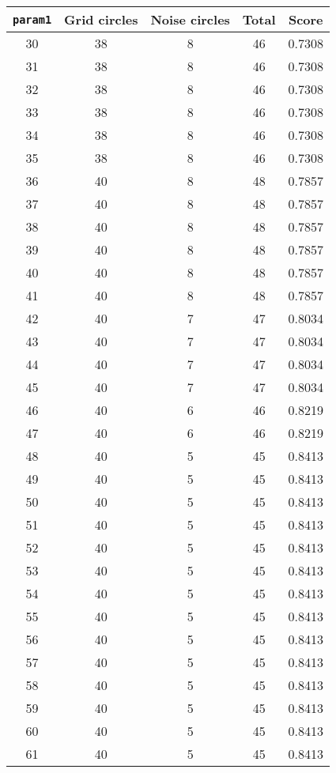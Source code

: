 \documentclass[letterpaper, 12pt]{article}
\begin{document}
\begin{longtable}{|c|c|c|c|c|}
\hline
\textbf{\texttt{param1}} & \textbf{Grid circles} & \textbf{Noise circles} & \textbf{Total} & \textbf{Score} \\
\hline
30 & 38 & 8 & 46 & 0.7308 \\
\hline
31 & 38 & 8 & 46 & 0.7308 \\
\hline
32 & 38 & 8 & 46 & 0.7308 \\
\hline
33 & 38 & 8 & 46 & 0.7308 \\
\hline
34 & 38 & 8 & 46 & 0.7308 \\
\hline
35 & 38 & 8 & 46 & 0.7308 \\
\hline
36 & 40 & 8 & 48 & 0.7857 \\
\hline
37 & 40 & 8 & 48 & 0.7857 \\
\hline
38 & 40 & 8 & 48 & 0.7857 \\
\hline
39 & 40 & 8 & 48 & 0.7857 \\
\hline
40 & 40 & 8 & 48 & 0.7857 \\
\hline
41 & 40 & 8 & 48 & 0.7857 \\
\hline
42 & 40 & 7 & 47 & 0.8034 \\
\hline
43 & 40 & 7 & 47 & 0.8034 \\
\hline
44 & 40 & 7 & 47 & 0.8034 \\
\hline
45 & 40 & 7 & 47 & 0.8034 \\
\hline
46 & 40 & 6 & 46 & 0.8219 \\
\hline
47 & 40 & 6 & 46 & 0.8219 \\
\hline
48 & 40 & 5 & 45 & 0.8413 \\
\hline
49 & 40 & 5 & 45 & 0.8413 \\
\hline
50 & 40 & 5 & 45 & 0.8413 \\
\hline
51 & 40 & 5 & 45 & 0.8413 \\
\hline
52 & 40 & 5 & 45 & 0.8413 \\
\hline
53 & 40 & 5 & 45 & 0.8413 \\
\hline
54 & 40 & 5 & 45 & 0.8413 \\
\hline
55 & 40 & 5 & 45 & 0.8413 \\
\hline
56 & 40 & 5 & 45 & 0.8413 \\
\hline
57 & 40 & 5 & 45 & 0.8413 \\
\hline
58 & 40 & 5 & 45 & 0.8413 \\
\hline
59 & 40 & 5 & 45 & 0.8413 \\
\hline
60 & 40 & 5 & 45 & 0.8413 \\
\hline
61 & 40 & 5 & 45 & 0.8413 \\

\end{longtable}
\end{document}
